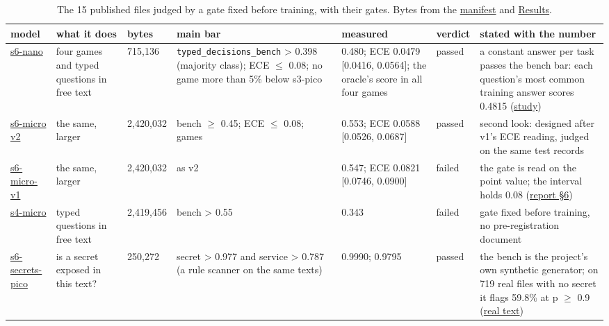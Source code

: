 \documentclass[10pt]{article}
\renewcommand{\arraystretch}{1.15}
\begin{document}
\begin{table}[p]
\centering
\scriptsize
\setlength{\tabcolsep}{2.5pt}\renewcommand{\arraystretch}{1.0}
\caption[The 15 published files judged by a gate fixed before training, with their gates.]{The 15 published files judged by a gate fixed before training, with their gates. Bytes from the \href{https://maxgfr.github.io/skycmd/models/manifest.json}{manifest} and \href{https://maxgfr.github.io/skycmd/results/}{Results}.}\label{tab:1}
\begin{tabularx}{\linewidth}{@{}P{1.75cm}P{1.85cm}R{1.05cm}LLP{1.45cm}L@{}}
\toprule
model & what it does & bytes & main bar & measured & verdict & stated with the number \\
\midrule
\href{https://maxgfr.github.io/skycmd/results/\#s6-nano-passed-published-at-full-depth}{s6-nano} & four games and typed questions in free text & 715,136 & \texttt{typed\_\allowbreak{}decisions\_\allowbreak{}bench} \textgreater{} 0.398 (majority class); ECE $\leq$ 0.08; no game more than 5\% below s3-pico & 0.480; ECE 0.0479 [0.0416, 0.0564]; the oracle's score in all four games & passed & a constant answer per task passes the bench bar: each question's most common training answer scores 0.4815 (\href{https://github.com/maxgfr/skycmd/blob/main/docs/s6-nano2-study.md}{study}) \\
\href{https://maxgfr.github.io/skycmd/results/\#s6-micro-v2-passed-on-a-second-look}{s6-micro v2} & the same, larger & 2,420,032 & bench $\geq$ 0.45; ECE $\leq$ 0.08; games & 0.553; ECE 0.0588 [0.0526, 0.0687] & passed & second look: designed after v1's ECE reading, judged on the same test records \\
\href{https://maxgfr.github.io/skycmd/results/\#s6-micro-v1-failed-on-calibration-only}{s6-micro-v1} & the same, larger & 2,420,032 & as v2 & 0.547; ECE 0.0821 [0.0746, 0.0900] & failed & the gate is read on the point value; the interval holds 0.08 (\href{https://github.com/maxgfr/skycmd/blob/main/docs/big-run-report.md}{report \S{}6}) \\
\href{https://github.com/maxgfr/skycmd/blob/main/BENCH.md\#skycmd-s4-s4-micro-generic-decisions-distilled-from-qwen35-experimental}{s4-micro} & typed questions in free text & 2,419,456 & bench \textgreater{} 0.55 & 0.343 & failed & gate fixed before training, no pre-registration document \\
\href{https://maxgfr.github.io/skycmd/results/\#s6-secrets-pico-passed-published-at-full-depth}{s6-secrets-pico} & is a secret exposed in this text? & 250,272 & secret \textgreater{} 0.977 and service \textgreater{} 0.787 (a rule scanner on the same texts) & 0.9990; 0.9795 & passed & the bench is the project's own synthetic generator; on 719 real files with no secret it flags 59.8\% at p $\geq$ 0.9 (\href{https://maxgfr.github.io/skycmd/results/\#s6-secrets-real-text}{real text}) \\

\end{tabularx}
\end{table}
\end{document}
